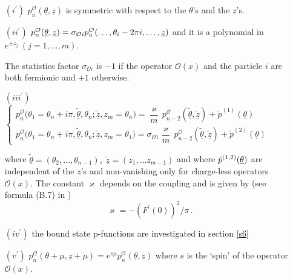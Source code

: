 \documentclass[a4paper,a4paper]{article}
\begin{document}
\begin{itemize}
\item[$(i^{\prime })$]  $p_{n}^{\mathcal{O}}(\underline{\theta },\underline{z%
})$ is symmetric with respect to the $\theta $'s and the $z$'s.

\item[$(ii^{\prime })$]  $p_{n}^{\mathcal{O}}(\underline{\theta },\underline{%
z})=\sigma _{\mathcal{O}i}p_{n}^{\mathcal{O}}(\dots ,\theta _{i}-2\pi
i,\dots ,\underline{z})$ and it is a polynomial in $e^{\pm z_{j}}~(j=1,\dots
,m)$.

The statistics factor $\sigma _{\mathcal{O}i}$ is $-1$ if the operator $%
\mathcal{O}(x)$ and the particle $i$ are both fermionic and $+1$ otherwise.

\item[$(iii^{\prime })$]  $\left\{ 
\begin{array}{l}
p_{n}^{\mathcal{O}}(\theta _{1}=\theta _{n}+i\pi ,\tilde{\underline{\theta }}%
,\theta _{n};\tilde{\underline{z}},z_{m}=\theta _{n}{)}=\dfrac{\varkappa }{m}%
\,p_{n-2}^{\mathcal{O}}(\tilde{\underline{\theta }},\tilde{\underline{z}})+%
\tilde{p}^{(1)}({\underline{\theta }}) \\ 
p_{n}^{\mathcal{O}}(\theta _{1}=\theta _{n}+i\pi ,\tilde{\underline{\theta }}%
,\theta _{n};\tilde{\underline{z}},z_{m}=\theta _{1}{)}=\sigma _{\mathcal{O}%
1}\dfrac{\varkappa }{m}\,p_{n-2}^{\mathcal{O}}(\tilde{\underline{\theta }},%
\tilde{\underline{z}})+\tilde{p}^{(2)}({\underline{\theta }})
\end{array}
\right. $

where $\tilde{\underline{\theta }}=(\theta _{2},\dots ,\theta _{n-1}),\;%
\tilde{\underline{z}}=(z_{1},\dots z_{m-1})$ and where $\tilde{p}^{(1,2)}({%
\underline{\theta }})$ are independent of the $z$'s and non-vanishing only
for charge-less operators $\mathcal{O}(x)$. The constant $\varkappa $
depends on the coupling and is given by (see formula (B.7) in \cite{BFKZ}) 
\begin{equation}
\varkappa =-\left( F^{\prime }(0)\right) ^{2}/\pi \,.  \label{3.1}
\end{equation}

\item[$(iv^{\prime })$]  the bound state p-functions are investigated in
section \ref{s6}

\item[$(v^{\prime })$]  $p_{n}^{\mathcal{O}}(\underline{\theta }+\mu ,%
\underline{z}+\mu )=e^{s\mu }p_{n}^{\mathcal{O}}(\underline{\theta },%
\underline{z})$ where $s$ is the `spin' of the operator $\mathcal{O}(x)$.
\end{itemize}
\end{document}
